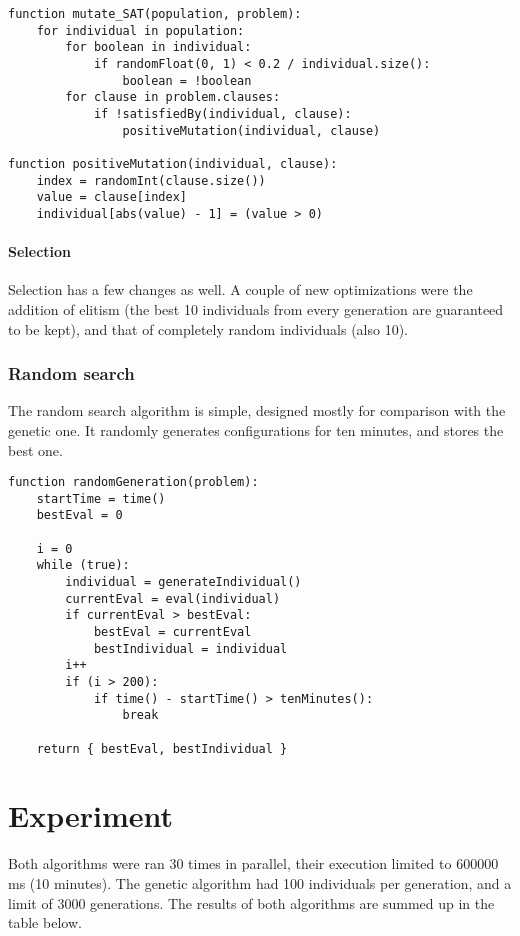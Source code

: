 \documentclass{article}
\begin{document}
\begin{verbatim}
function mutate_SAT(population, problem):
    for individual in population:
        for boolean in individual:
            if randomFloat(0, 1) < 0.2 / individual.size():
                boolean = !boolean
        for clause in problem.clauses:
            if !satisfiedBy(individual, clause):
                positiveMutation(individual, clause)

function positiveMutation(individual, clause):
    index = randomInt(clause.size())
    value = clause[index]
    individual[abs(value) - 1] = (value > 0)
\end{verbatim}

\paragraph{Selection}
Selection has a few changes as well. A couple of new optimizations were the addition of elitism (the best 10 individuals from every generation are guaranteed to be kept), and that of completely random individuals (also 10). 

\subsubsection{Random search}
The random search algorithm is simple, designed mostly for comparison with the genetic one. It randomly generates configurations for ten minutes, and stores the best one.

\begin{verbatim}
function randomGeneration(problem):
    startTime = time()
    bestEval = 0
    
    i = 0
    while (true):
        individual = generateIndividual()
        currentEval = eval(individual)
        if currentEval > bestEval:
            bestEval = currentEval
            bestIndividual = individual
        i++
        if (i > 200):
            if time() - startTime() > tenMinutes():
                break
    
    return { bestEval, bestIndividual }
\end{verbatim}

\section{Experiment}
Both algorithms were ran 30 times in parallel, their execution limited to 600000 ms (10 minutes). The genetic algorithm had 100 individuals per generation, and a limit of 3000 generations. The results of both algorithms are summed up in the table below.
\end{document}
